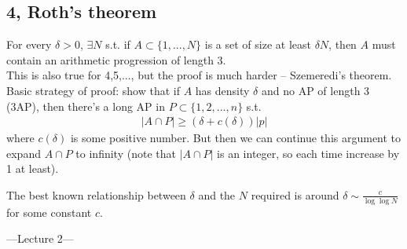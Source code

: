 \documentclass[a4paper]{article}
\begin{document}
\subsection{4, Roth's theorem}
\begin{thm}
    For every $\delta > 0$, $\exists N$ s.t. if $A \subset \{1,...,N\}$ is a set of size at least $\delta N$, then $A$ must contain an arithmetic progression of length 3.\\
    This is also true for 4,5,..., but the proof is much harder -- Szemeredi's theorem.\\
    Basic strategy of proof: show that if $A$ has density $\delta$ and no AP of length 3 (3AP), then there's a long AP in $P \subset \{1,2,...,n\}$ s.t.
    \begin{equation*}
        \begin{aligned}
            |A \cap P| \geq (\delta+c(\delta)) |p|
        \end{aligned}
    \end{equation*}
    where $c(\delta)$ is some positive number. But then we can continue this argument to expand $A\cap P$ to infinity (note that $|A\cap P|$ is an integer, so each time increase by 1 at least).

    The best known relationship between $\delta$ and the $N$ required is around $\delta \sim \frac{c}{\log\log N}$ for some constant $c$.
\end{thm}

---Lecture 2---
\end{document}
